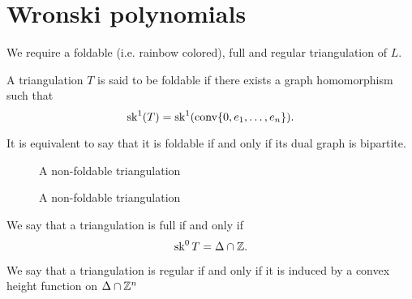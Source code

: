 \section{Wronski polynomials}

We require a foldable (i.e. rainbow colored), full and regular triangulation of $L$.

\begin{definition}
A triangulation $T$ is said to be foldable if there exists a graph homomorphism such that
$$\operatorname{sk}^1(T) = \operatorname{sk}^1(\operatorname{conv}\{0,e_1,\dots,e_n\}).$$

It is equivalent to say that it is foldable if and only if its dual graph is bipartite.
\end{definition}

\begin{figure}
\caption{A non-foldable triangulation}
\end{figure}

\begin{figure}
\caption{A non-foldable triangulation}
\end{figure}


\begin{definition}
We say that a triangulation is full if and only if
$$\operatorname{sk}^0 T = \Delta \cap \mathbb{Z}.$$
\end{definition}

\begin{definition}
We say that a triangulation is regular if and only if it is induced by a convex height function on $\Delta \cap \mathbb{Z}^n$
\end{definition}
